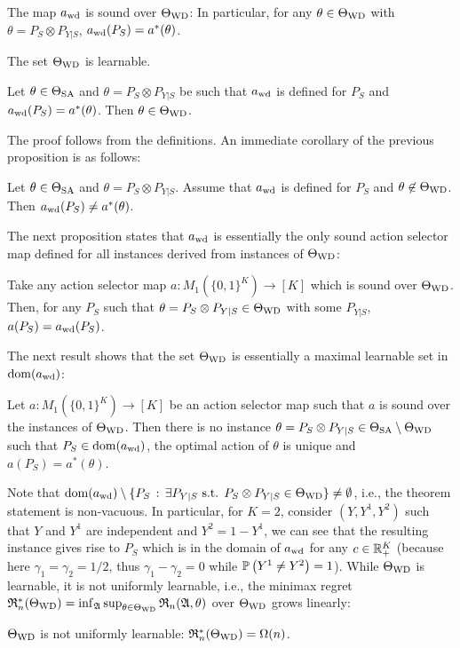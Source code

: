 \begin{prop}
\label{prop:awdsound}
The map $a_{\mathrm{wd}}$ is sound over $\Theta_{\mathrm{WD}}$: In particular, for any
$\theta\in \Theta_{\mathrm{WD}}$ with $\theta = P_S\otimes P_{Y|S}$, $a_{\mathrm{wd}}(P_S)= a^*(\theta)$.
\end{prop}

\begin{cor}\label{cor:twdlearnable}
The set $\Theta_{\mathrm{WD}}$ is learnable.
\end{cor}

\begin{prop}
\label{prop:awdcorrectimplieswd}
Let $\theta \in \Theta_{\mathrm{SA}}$ and $\theta = P_S\otimes P_{Y|S}$ be such that $a_{\mathrm{wd}}$ is defined for $P_S$
and $a_{\mathrm{wd}}(P_S) = a^*(\theta)$. Then $\theta \in \Theta_{\mathrm{WD}}$.
\end{prop}
The proof follows from the definitions. An immediate corollary of the previous proposition is as follows:
\begin{cor}\label{cor:awdoutsideincorrect}
Let $\theta \in \Theta_{\mathrm{SA}}$ and $\theta = P_S \otimes P_{Y|S}$. 
Assume that $a_{\mathrm{wd}}$ is defined for $P_S$ and $\theta \not\in \Theta_{\mathrm{WD}}$. Then $a_{\mathrm{wd}}(P_S) \ne a^*(\theta)$.
\end{cor}
The next proposition states that $a_{\mathrm{wd}}$ is essentially the only sound action selector map defined for
 all instances derived from instances of $\Theta_{\mathrm{WD}}$:
\begin{prop}\label{prop:awdunique}
Take any action selector map $a: M_1( \{0,1\}^K ) \to [K]$ which is sound over $\Theta_{\mathrm{WD}}$.
Then, for any $P_S$ such that $\theta = P_S\otimes P_{Y|S}\in \Theta_{\mathrm{WD}}$ with some $P_{Y|S}$,
 $a(P_S) = a_{\mathrm{wd}}(P_S)$.
\end{prop}

The next result shows that
the set $\Theta_{\mathrm{WD}}$ is essentially a maximal learnable set in $\mathrm{dom}(a_{\mathrm{wd}})$:
\begin{thm}
	\label{thm:MaxLearnability}
Let $a: M_1(\{0,1\}^K) \to [K]$ be an action selector map
such that $a$ is sound over the instances of $\Theta_{\mathrm{WD}}$.
Then there is no instance $\theta = P_S\otimes P_{Y|S} \in \Theta_{\mathrm{SA}}\setminus \Theta_{\mathrm{WD}}$ such that 
$P_S\in \mathrm{dom}(a_{\mathrm{wd}})$, the optimal action of $\theta$ is unique
 and $a(P_S) = a^*(\theta)$.
\end{thm}
Note that $\mathrm{dom}(a_{\mathrm{wd}})\setminus \{ P_S \,:\, \exists P_{Y|S} \textrm{ s.t. } P_S \otimes P_{Y|S} \in \Theta_{\mathrm{WD}} \} \ne \emptyset$, i.e., the theorem statement is non-vacuous.
In particular, for $K=2$, consider $(Y,Y^1,Y^2)$ such that $Y$ and $Y^1$ are independent and $Y^2 = 1-Y^1$, we can see that the resulting instance gives rise to $P_S$ which is in the domain of $a_{\mathrm{wd}}$ for any $c\in \mathbb{R}_+^K$ (because here $\gamma_1 = \gamma_2 = 1/2$, thus $\gamma_1 - \gamma_2 = 0$ while $\mathbb{P}\left(Y^1\ne Y^2\right)=1$).
While $\Theta_{\mathrm{WD}}$ is learnable, it is not uniformly learnable, i.e., the minimax regret $\mathfrak{R}_n^*(\Theta_{\mathrm{WD}}) = \inf_{\mathfrak{A}} \sup_{\theta\in \Theta_{\mathrm{WD}}} \mathfrak{R}_n(\mathfrak{A},\theta)$ over $\Theta_{\mathrm{WD}}$ grows linearly:
\begin{thm}
\label{thm:nonunif}
$\Theta_{\mathrm{WD}}$ is not uniformly learnable:
$\mathfrak{R}_n^*(\Theta_{\mathrm{WD}}) = \Omega(n)$.
\end{thm}

